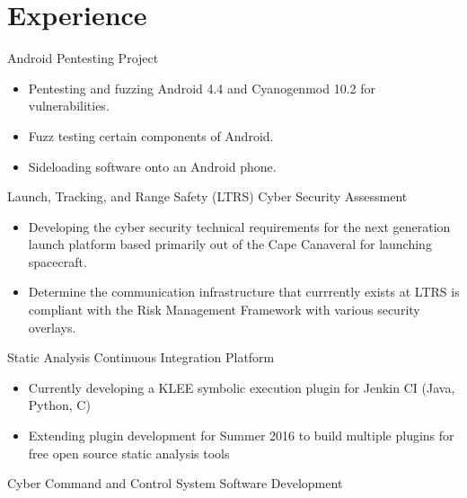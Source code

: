 \documentclass[letterpaper]{clinton-resume}
\begin{document}
\begin{minipage}[t]{0.66\textwidth}
\section{Experience}
\vspace{\topsep} 
\begin{tightitemize}
\item Android Pentesting Project
	\begin{itemize}
		\item Pentesting and fuzzing Android 4.4 and Cyanogenmod 10.2 for vulnerabilities.
		\item Fuzz testing certain components of Android.
		\item Sideloading software onto an Android phone.
	\end{itemize}
\item Launch, Tracking, and Range Safety (LTRS) Cyber Security Assessment
	\begin{itemize}
		\item Developing the cyber security technical requirements for the next generation launch platform based primarily out of the Cape Canaveral for launching spacecraft.  
		\item Determine the communication infrastructure that currrently exists at LTRS is compliant with the Risk Management Framework with various security overlays.
	\end{itemize}
\end{tightitemize}
\vspace{\topsep} 
\begin{tightitemize}
\item Static Analysis Continuous Integration Platform
	\begin{itemize}
		\item Currently developing a KLEE symbolic execution plugin for Jenkin CI (Java, Python, C)
		\item Extending plugin development for Summer 2016 to build multiple plugins for free open source static analysis tools
	\end{itemize}
\item Cyber Command and Control System Software Development
	\begin{itemize}

\end{itemize}
\end{tightitemize}
\end{minipage}
\end{document}
